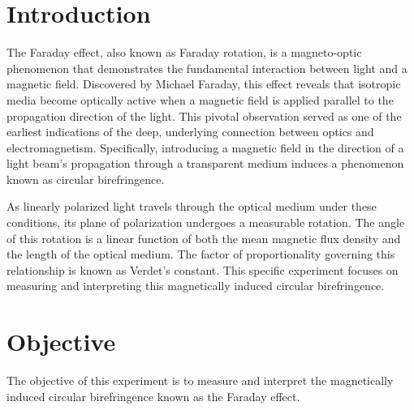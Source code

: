 
\renewcommand{\arraystretch}{1.5} %

\section{Introduction}
The Faraday effect, also known as Faraday rotation, is a magneto-optic phenomenon that demonstrates the fundamental interaction between light and a magnetic field. Discovered by Michael Faraday, this effect reveals that isotropic media become optically active when a magnetic field is applied parallel to the propagation direction of the light. This pivotal observation served as one of the earliest indications of the deep, underlying connection between optics and electromagnetism. Specifically, introducing a magnetic field in the direction of a light beam's propagation through a transparent medium induces a phenomenon known as circular birefringence.

As linearly polarized light travels through the optical medium under these conditions, its plane of polarization undergoes a measurable rotation. The angle of this rotation is a linear function of both the mean magnetic flux density and the length of the optical medium. The factor of proportionality governing this relationship is known as Verdet's constant. This specific experiment focuses on measuring and interpreting this magnetically induced circular birefringence.
\section{Objective}
The objective of this experiment is to measure and interpret the magnetically induced circular birefringence known as the Faraday effect.
